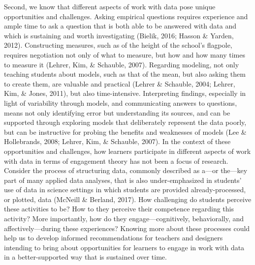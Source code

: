 \documentclass[]{book}
\theoremstyle{definition}
\theoremstyle{definition}
\theoremstyle{definition}
\theoremstyle{remark}
\begin{document}
Second, we know that different aspects of work with data pose unique
opportunities and challenges. Asking empirical questions requires
experience and ample time to ask a question that is both able to be
answered with data and which is sustaining and worth investigating
(Bielik, 2016; Hasson \& Yarden, 2012). Constructing measures, such as
of the height of the school's flagpole, requires negotiation not only of
what to measure, but how and how many times to measure it (Lehrer, Kim,
\& Schauble, 2007). Regarding modeling, not only teaching students about
models, such as that of the mean, but also asking them to create them,
are valuable and practical (Lehrer \& Schauble, 2004; Lehrer, Kim, \&
Jones, 2011), but also time-intensive. Interpreting findings, especially
in light of variability through models, and communicating answers to
questions, means not only identifying error but understanding its
sources, and can be supported through exploring models that deliberately
represent the data poorly, but can be instructive for probing the
benefits and weaknesses of models (Lee \& Hollebrands, 2008; Lehrer,
Kim, \& Schauble, 2007). In the context of these opportunities and
challenges, how learners participate in different aspects of work with
data in terms of engagement theory has not been a focus of research.
Consider the process of structuring data, commonly described as a---or
the---key part of many applied data analyses, that is also
under-emphasized in students' use of data in science settings in which
students are provided already-processed, or plotted, data (McNeill \&
Berland, 2017). How challenging do students perceive these activities to
be? How to they perceive their competence regarding this activity? More
importantly, how do they engage---cognitively, behaviorally, and
affectively---during these experiences? Knowing more about these
processes could help us to develop informed recommendations for teachers
and designers intending to bring about opportunities for learners to
engage in work with data in a better-supported way that is sustained
over time.
\end{document}
